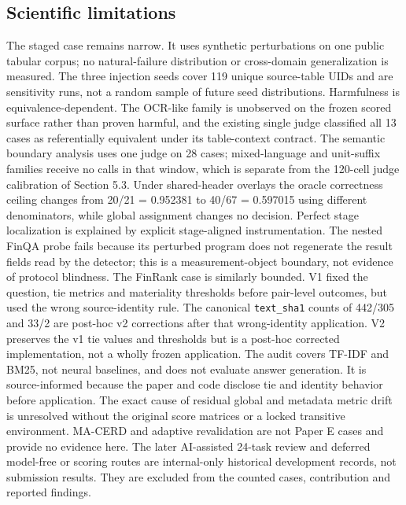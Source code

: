 \documentclass[10pt,conference]{IEEEtran}
\begin{document}
\subsection{Scientific limitations}
The staged case remains narrow. It uses synthetic perturbations on one public tabular corpus; no natural-failure distribution or cross-domain generalization is measured. The three injection seeds cover 119 unique source-table UIDs and are sensitivity runs, not a random sample of future seed distributions. Harmfulness is equivalence-dependent. The OCR-like family is unobserved on the frozen scored surface rather than proven harmful, and the existing single judge classified all 13 cases as referentially equivalent under its table-context contract. The semantic boundary analysis uses one judge on 28 cases; mixed-language and unit-suffix families receive no calls in that window, which is separate from the 120-cell judge calibration of Section 5.3. Under shared-header overlays the oracle correctness ceiling changes from 20/21 = 0.952381 to 40/67 = 0.597015 using different denominators, while global assignment changes no decision. Perfect stage localization is explained by explicit stage-aligned instrumentation. The nested FinQA probe fails because its perturbed program does not regenerate the result fields read by the detector; this is a measurement-object boundary, not evidence of protocol blindness.
The FinRank case is similarly bounded. V1 fixed the question, tie metrics and materiality thresholds before pair-level outcomes, but used the wrong source-identity rule. The canonical \texttt{text\_sha1} counts of 442/305 and 33/2 are post-hoc v2 corrections after that wrong-identity application. V2 preserves the v1 tie values and thresholds but is a post-hoc corrected implementation, not a wholly frozen application. The audit covers TF-IDF and BM25, not neural baselines, and does not evaluate answer generation. It is source-informed because the paper and code disclose tie and identity behavior before application. The exact cause of residual global and metadata metric drift is unresolved without the original score matrices or a locked transitive environment.
MA-CERD and adaptive revalidation are not Paper E cases and provide no evidence here. The later AI-assisted 24-task review and deferred model-free or scoring routes are internal-only historical development records, not submission results. They are excluded from the counted cases, contribution and reported findings.
\end{document}
